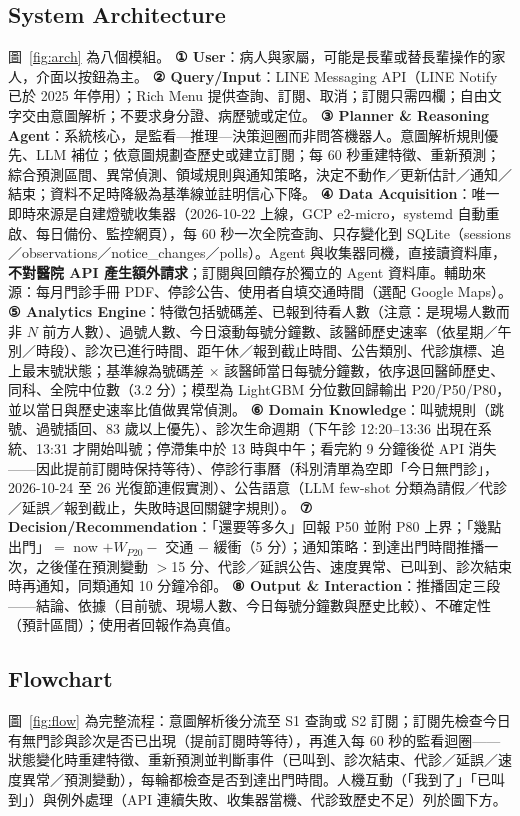 \documentclass[11pt,twocolumn]{article}
\begin{document}
\subsection{System Architecture}
圖~\ref{fig:arch} 為八個模組。
\textbf{① User}：病人與家屬，可能是長輩或替長輩操作的家人，介面以按鈕為主。
\textbf{② Query/Input}：LINE Messaging API（LINE Notify 已於 2025 年停用）；Rich Menu 提供查詢、訂閱、取消；訂閱只需四欄；自由文字交由意圖解析；不要求身分證、病歷號或定位。
\textbf{③ Planner \& Reasoning Agent}：系統核心，是監看—推理—決策迴圈而非問答機器人。意圖解析規則優先、LLM 補位；依意圖規劃查歷史或建立訂閱；每 60 秒重建特徵、重新預測；綜合預測區間、異常偵測、領域規則與通知策略，決定不動作／更新估計／通知／結束；資料不足時降級為基準線並註明信心下降。
\textbf{④ Data Acquisition}：唯一即時來源是自建燈號收集器（2026-10-22 上線，GCP e2-micro，systemd 自動重啟、每日備份、監控網頁），每 60 秒一次全院查詢、只存變化到 SQLite（sessions／observations／notice\_changes／polls）。Agent 與收集器同機，直接讀資料庫，\textbf{不對醫院 API 產生額外請求}；訂閱與回饋存於獨立的 Agent 資料庫。輔助來源：每月門診手冊 PDF、停診公告、使用者自填交通時間（選配 Google Maps）。
\textbf{⑤ Analytics Engine}：特徵包括號碼差、已報到待看人數（注意：是現場人數而非 $N$ 前方人數）、過號人數、今日滾動每號分鐘數、該醫師歷史速率（依星期／午別／時段）、診次已進行時間、距午休／報到截止時間、公告類別、代診旗標、追上最末號狀態；基準線為號碼差 $\times$ 該醫師當日每號分鐘數，依序退回醫師歷史、同科、全院中位數（3.2 分）；模型為 LightGBM 分位數回歸輸出 P20/P50/P80，並以當日與歷史速率比值做異常偵測。
\textbf{⑥ Domain Knowledge}：叫號規則（跳號、過號插回、83 歲以上優先）、診次生命週期（下午診 12:20--13:36 出現在系統、13:31 才開始叫號；停滯集中於 13 時與中午；看完約 9 分鐘後從 API 消失——因此提前訂閱時保持等待）、停診行事曆（科別清單為空即「今日無門診」，2026-10-24 至 26 光復節連假實測）、公告語意（LLM few-shot 分類為請假／代診／延誤／報到截止，失敗時退回關鍵字規則）。
\textbf{⑦ Decision/Recommendation}：「還要等多久」回報 P50 並附 P80 上界；「幾點出門」$=$ now $+ W_{P20} -$ 交通 $-$ 緩衝（5 分）；通知策略：到達出門時間推播一次，之後僅在預測變動 $>$15 分、代診／延誤公告、速度異常、已叫到、診次結束時再通知，同類通知 10 分鐘冷卻。
\textbf{⑧ Output \& Interaction}：推播固定三段——結論、依據（目前號、現場人數、今日每號分鐘數與歷史比較）、不確定性（預計區間）；使用者回報作為真值。



\subsection{Flowchart}
圖~\ref{fig:flow} 為完整流程：意圖解析後分流至 S1 查詢或 S2 訂閱；訂閱先檢查今日有無門診與診次是否已出現（提前訂閱時等待），再進入每 60 秒的監看迴圈——狀態變化時重建特徵、重新預測並判斷事件（已叫到、診次結束、代診／延誤／速度異常／預測變動），每輪都檢查是否到達出門時間。人機互動（「我到了」「已叫到」）與例外處理（API 連續失敗、收集器當機、代診致歷史不足）列於圖下方。
\end{document}
